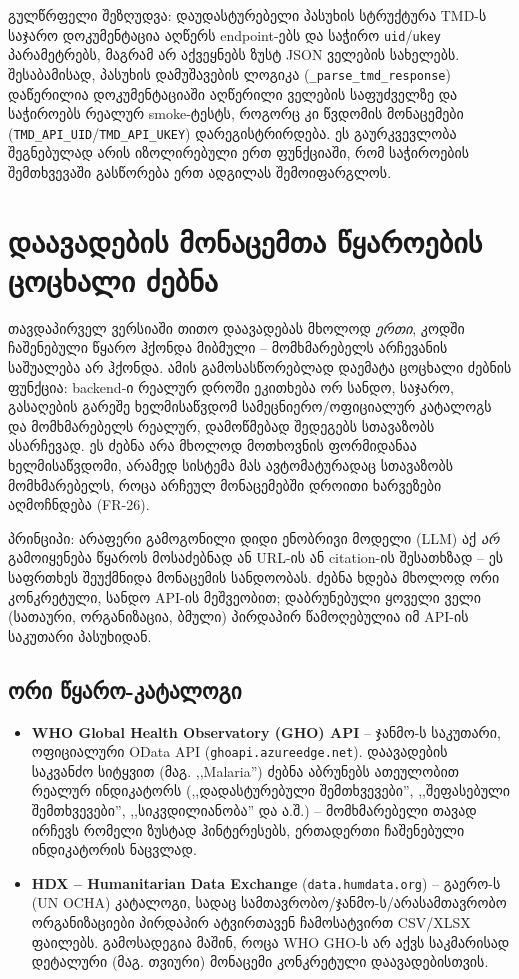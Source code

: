 \documentclass[11pt,a4paper]{article}
\begin{document}
\begin{infobox}{გულწრფელი შეზღუდვა: დაუდასტურებელი პასუხის სტრუქტურა}
TMD-ს საჯარო დოკუმენტაცია აღწერს endpoint-ებს და საჭირო
\texttt{uid}/\texttt{ukey} პარამეტრებს, მაგრამ არ აქვეყნებს ზუსტ JSON
ველების სახელებს. შესაბამისად, პასუხის დამუშავების ლოგიკა
(\texttt{\_parse\_tmd\_response}) დაწერილია დოკუმენტაციაში აღწერილი
ველების საფუძველზე და საჭიროებს რეალურ smoke-ტესტს, როგორც კი
წვდომის მონაცემები (\texttt{TMD\_API\_UID}/\texttt{TMD\_API\_UKEY})
დარეგისტრირდება. ეს გაურკვევლობა შეგნებულად არის იზოლირებული ერთ
ფუნქციაში, რომ საჭიროების შემთხვევაში გასწორება ერთ ადგილას
შემოიფარგლოს.
\end{infobox}

\section{დაავადების მონაცემთა წყაროების ცოცხალი ძებნა}
\label{sec:source-discovery}

თავდაპირველ ვერსიაში თითო დაავადებას მხოლოდ \emph{ერთი}, კოდში
ჩაშენებული წყარო ჰქონდა მიბმული -- მომხმარებელს არჩევანის საშუალება არ
ჰქონდა. ამის გამოსასწორებლად დაემატა ცოცხალი ძებნის ფუნქცია: backend-ი
რეალურ დროში ეკითხება ორ სანდო, საჯარო, გასაღების გარეშე ხელმისაწვდომ
სამეცნიერო/ოფიციალურ კატალოგს და მომხმარებელს რეალურ, დამოწმებად
შედეგებს სთავაზობს ასარჩევად. ეს ძებნა არა მხოლოდ მოთხოვნის ფორმიდანაა ხელმისაწვდომი, არამედ სისტემა მას ავტომატურადაც სთავაზობს მომხმარებელს, როცა არჩეულ მონაცემებში დროითი ხარვეზები აღმოჩნდება (FR-26).

\begin{infobox}{პრინციპი: არაფერი გამოგონილი}
დიდი ენობრივი მოდელი (LLM) აქ \emph{არ} გამოიყენება წყაროს მოსაძებნად ან
URL-ის ან citation-ის შესათხზად -- ეს საფრთხეს შეუქმნიდა მონაცემის
სანდოობას. ძებნა ხდება მხოლოდ ორი კონკრეტული, სანდო API-ის მეშვეობით;
დაბრუნებული ყოველი ველი (სათაური, ორგანიზაცია, ბმული) პირდაპირ
წამოღებულია იმ API-ის საკუთარი პასუხიდან.
\end{infobox}

\subsection{ორი წყარო-კატალოგი}
\begin{itemize}[leftmargin=1.4em]
  \item \textbf{WHO Global Health Observatory (GHO) API} -- ჯანმო-ს
    საკუთარი, ოფიციალური OData API (\texttt{ghoapi.azureedge.net}).
    დაავადების საკვანძო სიტყვით (მაგ. ,,Malaria'') ძებნა აბრუნებს
    ათეულობით რეალურ ინდიკატორს (,,დადასტურებული შემთხვევები'',
    ,,შეფასებული შემთხვევები'', ,,სიკვდილიანობა'' და ა.შ.) -- მომხმარებელი
    თავად ირჩევს რომელი ზუსტად ჰინტერესებს, ერთადერთი ჩაშენებული
    ინდიკატორის ნაცვლად.
  \item \textbf{HDX -- Humanitarian Data Exchange} (\texttt{data.humdata.org})
    -- გაერო-ს (UN OCHA) კატალოგი, სადაც სამთავრობო/ჯანმო-ს/არასამთავრობო
    ორგანიზაციები პირდაპირ ატვირთავენ ჩამოსატვირთ CSV/XLSX ფაილებს.
    გამოსადეგია მაშინ, როცა WHO GHO-ს არ აქვს საკმარისად დეტალური
    (მაგ. თვიური) მონაცემი კონკრეტული დაავადებისთვის.
\end{itemize}
\end{document}
